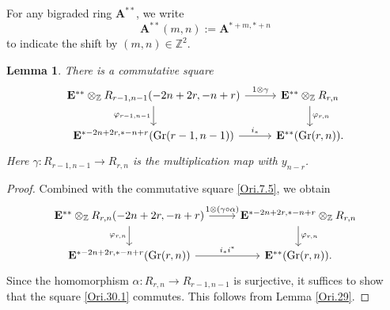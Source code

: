 \documentclass[11pt, a4paper]{amsart}
\newtheorem{lem}[thm]{Lemma}
\theoremstyle{definition}
\numberwithin{equation}{subsection}
\newcommand{\Z}{\mathbb{Z}}
\newcommand{\Gr}{{\mathrm{Gr}}}
\newcommand{\bA}{\mathbf{A}}
\newcommand{\ringE}{\mathbf{E}}
\begin{document}
For any bigraded ring $\bA^{**}$,
we write
\[
\bA^{**}(m,n)
:=
\bA^{*+m,*+n}
\]
to indicate the shift by $(m,n)\in \Z^2$.

\begin{lem}
\label{Ori.30}
There is a commutative square
\[
\begin{tikzcd}
\ringE^{**}\otimes_{\Z} R_{r-1,n-1}(-2n+2r,-n+r)\ar[r,"1\otimes \gamma"]\ar[d,"\varphi_{r-1,n-1}"']&
\ringE^{**}\otimes_{\Z} R_{r,n}\ar[d,"\varphi_{r,n}"]
\\
\ringE^{*-2n+2r,*-n+r}(\Gr(r-1,n-1))\ar[r,"i_*"]&
\ringE^{**}(\Gr(r,n)).
\end{tikzcd}
\]
Here $\gamma\colon R_{r-1,n-1}\to R_{r,n}$ is the multiplication map with $y_{n-r}$. 
\end{lem}
\begin{proof}
Combined with the commutative square \eqref{Ori.7.5}, we obtain 
\begin{equation}
\label{Ori.30.1}
\begin{tikzcd}
\ringE^{**}\otimes_{\Z} R_{r,n}(-2n+2r,-n+r)\ar[r,"1\otimes (\gamma\circ \alpha)"]\ar[d,"\varphi_{r,n}"']&
\ringE^{*-2n+2r,*-n+r}\otimes_{\Z} R_{r,n}\ar[d,"\varphi_{r,n}"]
\\
\ringE^{*-2n+2r,*-n+r}(\Gr(r,n))\ar[r,"i_*i^*"]&
\ringE^{**}(\Gr(r,n)).
\end{tikzcd}
\end{equation}
Since the homomorphism $\alpha \colon R_{r,n}\to R_{r-1,n-1}$ is surjective, it suffices to show that the square \eqref{Ori.30.1} commutes.
This follows from Lemma \ref{Ori.29}.
\end{proof}
\end{document}
